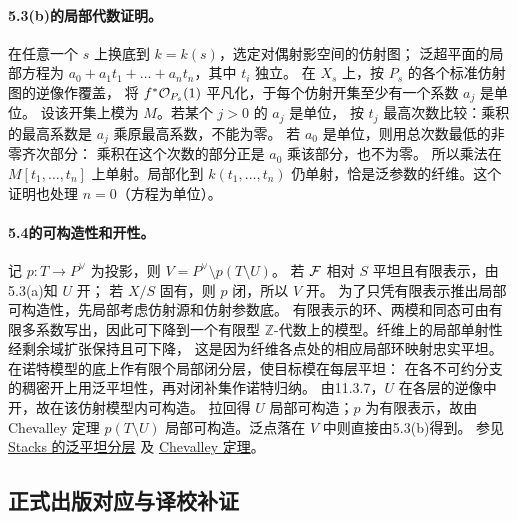 \paragraph{5.3(b)的局部代数证明。}
在任意一个 $s$ 上换底到 $k=k(s)$，选定对偶射影空间的仿射图；
泛超平面的局部方程为
$a_0+a_1t_1+\dots+a_nt_n$，其中 $t_i$ 独立。
在 $X_s$ 上，按 $P_s$ 的各个标准仿射图的逆像作覆盖，
将 $f^*\OO_{P_s}(1)$ 平凡化，于每个仿射开集至少有一个系数 $a_j$ 是单位。
设该开集上模为 $M$。若某个 $j>0$ 的 $a_j$ 是单位，
按 $t_j$ 最高次数比较：乘积的最高系数是 $a_j$ 乘原最高系数，不能为零。
若 $a_0$ 是单位，则用总次数最低的非零齐次部分：
乘积在这个次数的部分正是 $a_0$ 乘该部分，也不为零。
所以乘法在 $M[t_1,\ldots,t_n]$ 上单射。局部化到 $k(t_1,\ldots,t_n)$
仍单射，恰是泛参数的纤维。这个证明也处理 $n=0$（方程为单位）。

\paragraph{5.4的可构造性和开性。}
记 $p:T\to P^\vee$ 为投影，则 $V=P^\vee\setminus p(T\setminus U)$。
若 $\FF$ 相对 $S$ 平坦且有限表示，由5.3(a)知 $U$ 开；
若 $X/S$ 固有，则 $p$ 闭，所以 $V$ 开。
为了只凭有限表示推出局部可构造性，先局部考虑仿射源和仿射参数底。
有限表示的环、两模和同态可由有限多系数写出，因此可下降到一个有限型
$\mathbb Z$-代数上的模型。纤维上的局部单射性经剩余域扩张保持且可下降，
这是因为纤维各点处的相应局部环映射忠实平坦。
在诺特模型的底上作有限个局部闭分层，使目标模在每层平坦：
在各不可约分支的稠密开上用泛平坦性，再对闭补集作诺特归纳。
由11.3.7，$U$ 在各层的逆像中开，故在该仿射模型内可构造。
拉回得 $U$ 局部可构造；$p$ 为有限表示，故由 Chevalley 定理
$p(T\setminus U)$ 局部可构造。泛点落在 $V$ 中则直接由5.3(b)得到。
参见 \href{https://stacks.math.columbia.edu/tag/0H3Y}{Stacks 的泛平坦分层}
及 \href{https://stacks.math.columbia.edu/tag/054K}{Chevalley 定理}。

\endgroup


\hypertarget{D18-095-notes}{}
\begingroup
\def\OO{\mathcal O}\def\FF{\mathcal F}\def\GG{\mathcal G}
\def\PP{\mathbf P}\def\calP{\mathcal P}\def\dd{\delta}
\def\Div{\operatorname{Div}}\def\depth{\operatorname{depth}}
\def\pr{\operatorname{pr}}\def\coker{\operatorname{coker}}
\subsection*{正式出版对应与译校补证}
